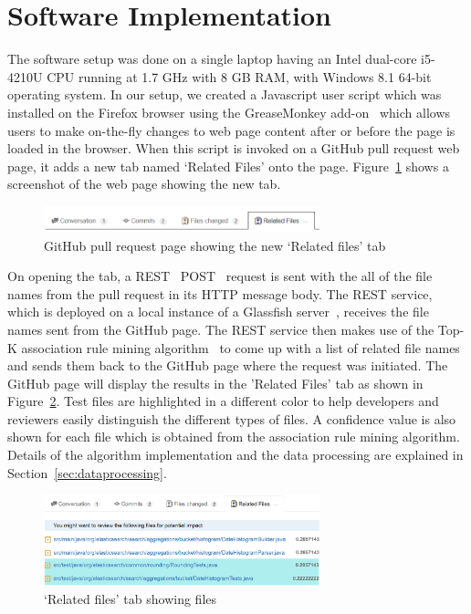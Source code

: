 
\section{Software Implementation}
\label{sec:setup}

The software setup was done on a single laptop having an Intel dual-core i5-4210U CPU running at 1.7 GHz with 8 GB RAM, with Windows 8.1 64-bit operating system. In our setup, we created a Javascript user script which was installed on the Firefox browser using the GreaseMonkey add-on~\cite{greasemonkey1,greasemonkey2} which allows users to make on-the-fly changes to web page content after or before the page is loaded in the browser. When this script is invoked on a GitHub pull request web page, it adds a new tab named `Related Files' onto the page. Figure~\ref{fig:newTabRelated} shows a screenshot of the web page showing the new tab.

\begin{figure}[ht!]
\centering
\includegraphics[width=8cm]{NewTabRelatedFiles}
\caption{GitHub pull request page showing the new `Related files' tab}
\label{fig:newTabRelated}
\end{figure}

On opening the tab, a REST~\cite{rest} POST~\cite{post_http} request is sent with the all of the file names from the pull request in its HTTP message body. The REST service, which is deployed on a local instance of a Glassfish server~\cite{glassfish}, receives the file names sent from the GitHub page. The REST service then makes use of the Top-K association rule mining algorithm~\cite{fournier2012mining} to come up with a list of related file names and sends them back to the GitHub page where the request was initiated. The GitHub page will display the results in the 'Related Files' tab as shown in Figure~\ref{fig:relatedFilesContents}. Test files are highlighted in a different color to help developers and reviewers easily distinguish the different types of files. A confidence value is also shown for each file which is obtained from the association rule mining algorithm. Details of the algorithm implementation and the data processing are explained in Section~\ref{sec:dataprocessing}.

\begin{figure}[ht!]
\centering
\includegraphics[width=8cm]{RelatedFilesContents}
\caption{`Related files' tab showing files}
\label{fig:relatedFilesContents}
\end{figure}



